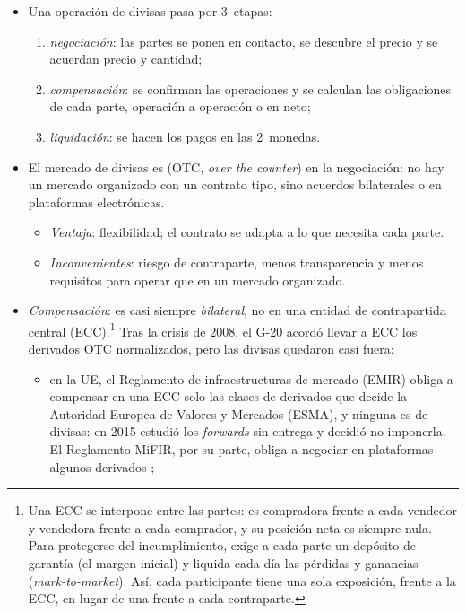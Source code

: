 \documentclass[11pt]{article}
\begin{document}
\begin{itemize}
\item Una operación de divisas pasa por 3~etapas:
  \begin{enumerate}
  \item \emph{negociación}: las partes se ponen en contacto, se descubre el precio y se acuerdan precio y cantidad;
  \item \emph{compensación}: se confirman las operaciones y se calculan las obligaciones de cada parte, operación a operación o en neto;
  \item \emph{liquidación}: se hacen los pagos en las 2~monedas.
  \end{enumerate}
\item El mercado de divisas es  (OTC, \emph{over the counter}) en la negociación: no hay un mercado organizado con un contrato tipo, sino acuerdos bilaterales o en plataformas electrónicas.
  \begin{itemize}
  \item \emph{Ventaja}: flexibilidad; el contrato se adapta a lo que necesita cada parte.
  \item \emph{Inconvenientes}: riesgo de contraparte, menos transparencia y menos requisitos para operar que en un mercado organizado.
  \end{itemize}
\item \emph{Compensación}: es casi siempre \emph{bilateral}, no en una entidad de contrapartida central (ECC).\footnote{Una ECC se interpone entre las partes: es compradora frente a cada vendedor y vendedora frente a cada comprador, y su posición neta es siempre nula. Para protegerse del incumplimiento, exige a cada parte un depósito de garantía (el margen inicial) y liquida cada día las pérdidas y ganancias (\emph{mark-to-market}). Así, cada participante tiene una sola exposición, frente a la ECC, en lugar de una frente a cada contraparte\nocite{NunezValdeolivas2019CCP}.} Tras la crisis de 2008, el G-20 acordó llevar a ECC los derivados OTC normalizados\nocite{G20Pittsburgh2009}, pero las divisas quedaron casi fuera:
  \begin{itemize}
  \item en la UE, el Reglamento de infraestructuras de mercado (EMIR) obliga a compensar en una ECC solo las clases de derivados que decide la Autoridad Europea de Valores y Mercados (ESMA), y ninguna es de divisas: en 2015 estudió los \emph{forwards} sin entrega y decidió no imponerla\nocite{UE2012EMIR,ESMA2015NDF}. El Reglamento MiFIR, por su parte, obliga a negociar en plataformas algunos derivados\nocite{UE2014MiFIR} ;

\end{itemize}
\end{itemize}
\end{document}

